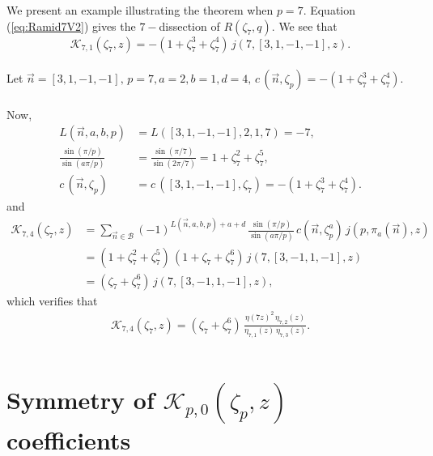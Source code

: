 \documentclass[12pt]{amsart}
\theoremstyle{definition}
\theoremstyle{remark}
\numberwithin{equation}{section}
\newcommand\eqn[1]{(\ref{eq:#1})}
\begin{document}
We present an example illustrating the theorem when $p=7$. Equation \eqn{Ramid7V2} gives the $7-$dissection of $R(\zeta_7,q)$. We see that $$\mathcal{K}_{7,1}(\zeta_7, z)=- (1+\zeta_7^3 + \zeta_7^4) \, j(7,[3,1,-1,-1],z).$$
\\
Let $\overrightarrow{n}=[3,1,-1,-1], \, p=7, a=2, b=1, d=4, \, c\,(\overrightarrow{n},\zeta_p)=- (1+\zeta_7^3 + \zeta_7^4)$.
\\\\
Now, 
\begin{align*}
L(\overrightarrow{n},a,b,p)&=L([3,1,-1,-1],2,1,7)=-7,
\\
\frac{\sin(\pi/p)}{\sin(a\pi/p)}&=\frac{\sin(\pi/7)}{\sin(2\pi/7)}=1+\zeta_7^2 + \zeta_7^5,
\\
c\,(\overrightarrow{n},\zeta_p)&=c\,([3,1,-1,-1],\zeta_7)=- (1+\zeta_7^3 + \zeta_7^4).
\end{align*}
and 
\begin{align*}
\mathcal{K}_{7,4}(\zeta_7,z)&=\sum\limits_{\overrightarrow{n} \in \mathcal{B}}(-1)^{L(\overrightarrow{n},a,b,p)+a+d}\,\frac{\sin(\pi/p)}{\sin(a\pi/p)}\,c(\overrightarrow{n},\zeta_p^a)\, j(p,\pi_a(\overrightarrow{n}),z)
\\
&=(1+\zeta_7^2 + \zeta_7^5) \,(1+\zeta_7 + \zeta_7^6) \, j(7,[3,-1,1,-1],z)
\\
&=(\zeta_7 + \zeta_7^6) \, j(7,[3,-1,1,-1],z),
\end{align*}
which verifies that 
\begin{align*}
\mathcal{K}_{7,4}(\zeta_7,z)=(\zeta_7 + \zeta_7^6) \, \frac{\eta(7z)^2 \, \eta_{7,2}(z)}{\eta_{7,1}(z)\, \eta_{7,3}(z)}.\\\\
\end{align*}




\section{Symmetry of $\mathcal{K}_{p,0}(\zeta_p,z)$ coefficients}
\end{document}
